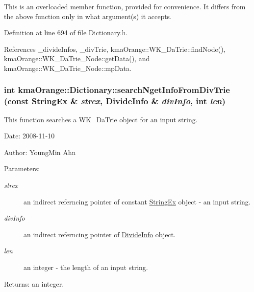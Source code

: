 This is an overloaded member function, provided for convenience. It differs from the above function only in what argument(s) it accepts. 

Definition at line 694 of file Dictionary.h.

References \_\-divideInfos, \_\-divTrie, kmaOrange::WK\_\-DaTrie::findNode(), kmaOrange::WK\_\-DaTrie\_\-Node::getData(), and kmaOrange::WK\_\-DaTrie\_\-Node::mpData.\hypertarget{classkmaOrange_1_1Dictionary_ad13925876b52d5e15ad8a9063dd21c4}{
\subsubsection[{searchNgetInfoFromDivTrie}]{\setlength{\rightskip}{0pt plus 5cm}int kmaOrange::Dictionary::searchNgetInfoFromDivTrie (const {\bf StringEx} \& {\em strex}, \/  {\bf DivideInfo} \& {\em divInfo}, \/  int {\em len})}}
\label{classkmaOrange_1_1Dictionary_ad13925876b52d5e15ad8a9063dd21c4}


This function searches a \hyperlink{classkmaOrange_1_1WK__DaTrie}{WK\_\-DaTrie} object for an input string. 

\begin{Desc}
\item[Date:]2008-11-10 \end{Desc}
\begin{Desc}
\item[Author:]YoungMin Ahn \end{Desc}
\begin{Desc}
\item[Parameters:]
\begin{description}
\item[{\em strex}]an indirect referncing pointer of constant \hyperlink{classStringEx}{StringEx} object - an input string. \item[{\em divInfo}]an indirect referncing pointer of \hyperlink{classDivideInfo}{DivideInfo} object. \item[{\em len}]an integer - the length of an input string. \end{description}
\end{Desc}
\begin{Desc}
\item[Returns:]an integer. \end{Desc}



